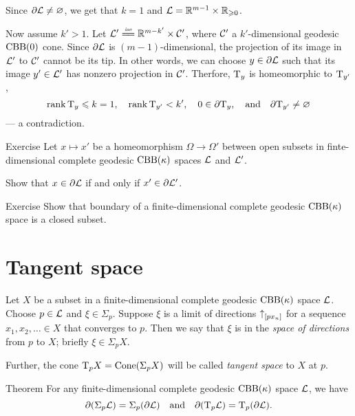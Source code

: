 Since $\partial \mathcal{L}\ne \varnothing$, we get that $k=1$ and $\mathcal{L}=\mathbb{R}^{m-1}\times\mathbb{R}_{\geqslant0}$.

Now assume $k'> 1$.
Let $\spc{L}'\iso \RR^{m-k'}\times \spc{C}'$, where $\mathcal{C}'$ a $k'$-dimensional geodesic $\mathrm{CBB}(0)$ cone.
Since $\partial\mathcal{L}$ is $(m-1)$-dimensional,
the projection of its image in $\mathcal{L}'$ to $\mathcal{C}'$
cannot be its tip.
In other words, we can choose $y\in \partial \mathcal{L}$ such that its image $y'\in \mathcal{L}'$ has nonzero projection in $\mathcal{C}'$.
Therfore, $\mathrm{T}_y$ is homeomorphic to $\mathrm{T}_{y'}$, 
\[\operatorname{\rm rank}\nolimits\mathrm{T}_y\leqslant k=1,
\quad
\operatorname{\rm rank}\nolimits\mathrm{T}_{y'}< k',
\quad
0\in \partial \mathrm{T}_y,
\quad\text{and}\quad
\partial \mathrm{T}_{y'}\ne \varnothing\]
--- a contradiction.
\qeds

\begin{thm}{Exercise}\label{ex:bry2bry}
Let $x\mapsto x'$ be a homeomorphism $\Omega\to\Omega'$
between open subsets in finte-dimensional complete geodesic $\mathrm{CBB}(\kappa)$ spaces $\mathcal{L}$ and $\mathcal{L}'$.

Show that $x\in \partial \mathcal{L}$ if and only if $x'\in \partial \mathcal{L}'$.

\end{thm}

\begin{thm}{Exercise}\label{ex:bry-closed}
Show that boundary of a finite-dimensional complete geodesic $\mathrm{CBB}(\kappa)$ space is a closed subset.
\end{thm}

\section{Tangent space}

Let $X$ be a subset in a finite-dimensional complete geodesic $\mathrm{CBB}(\kappa)$ space $\mathcal{L}$.
Choose $p\in \mathcal{L}$ and $\xi\in \Sigma_p$.
Suppose $\xi$ is a limit of directions ${\uparrow}_{[{p}{x_n}]}$ for a sequence $x_1,x_2,\dots{}\in X$ that converges to $p$.
Then we say that $\xi$ is in the \emph{space of directions} from $p$ to $X$; briefly $\xi\in\Sigma_pX$.

Further, the cone $\mathrm{T}_pX=\mathop{\rm Cone}\nolimits(\Sigma_pX)$ will be called \emph{tangent space} to $X$ at $p$.

\begin{thm}{Theorem}\label{thm:partial-Sigma}
For any finite-dimensional complete geodesic $\mathrm{CBB}(\kappa)$ space $\mathcal{L}$, we have
\[\partial (\Sigma_p\mathcal{L})=\Sigma_p(\partial\mathcal{L})
\quad\text{and}\quad
\partial(\mathrm{T}_p\mathcal{L})=\mathrm{T}_p(\partial\mathcal{L}).\]
\end{thm}


